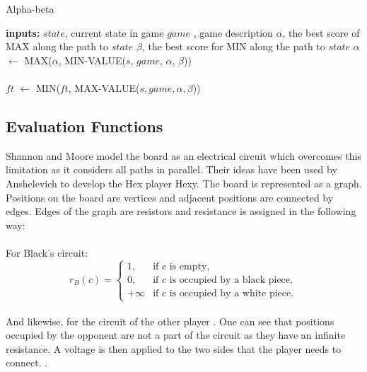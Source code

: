 \documentclass{ba-kecs}
\begin{document}
\begin{algorithm}
	\caption{Alpha-beta}
	\label{alg:alphabeta}
	\begin{algorithmic}
		\State \textbf{inputs: } $state$, current state in game
		\State $game$ , game description
		\State $\alpha$, the best score of MAX along the path to $state$
		\State $\beta$, the best score for MIN along the path to $state$
		\State 
			\State {}
		\EndIf
			\State $\alpha$ $\leftarrow$ MAX($\alpha$, MIN-VALUE($s$, $game$, $\alpha$, $\beta$))
		\EndFor \label{}
		\EndFunction\\
		
		 \\
		\State {}
		\EndIf
			\State $ft$ $\leftarrow$ MIN($ft$, MAX-VALUE($s, game , \alpha, \beta$)) 
			\EndIf
		\EndFor \label{}
		\EndFunction
		
	\end{algorithmic}
\end{algorithm}

\subsection{Evaluation Functions}
Shannon and Moore \cite{shannon1953computers} model the board as an electrical circuit which overcomes this limitation as it considers all paths in parallel. Their ideas have been used by Anshelevich \cite{anshelevich2002hierarchical} to develop the Hex player Hexy. The board is represented as a graph. Positions on the board are vertices and adjacent positions are connected by edges. Edges of the graph are resistors and resistance is assigned in the following way: 
\\
\\
For Black's circuit:  \\
\begin{equation*}
r_B(c)=\begin{cases}
1, & \text{if $c$ is empty},\\
0, & \text{if $c$ is occupied by a black piece},\\
+\infty & \text{if $c$ is occupied by a white piece}.
\end{cases}
\end{equation*}
\\
And likewise, for the circuit of the other player . 
One can see that positions occupied by the opponent are not a part of the circuit as they have an infinite resistance. A voltage is then applied to the two sides that the player needs to connect. \cite{anshelevich2002hierarchical}.
\end{document}
